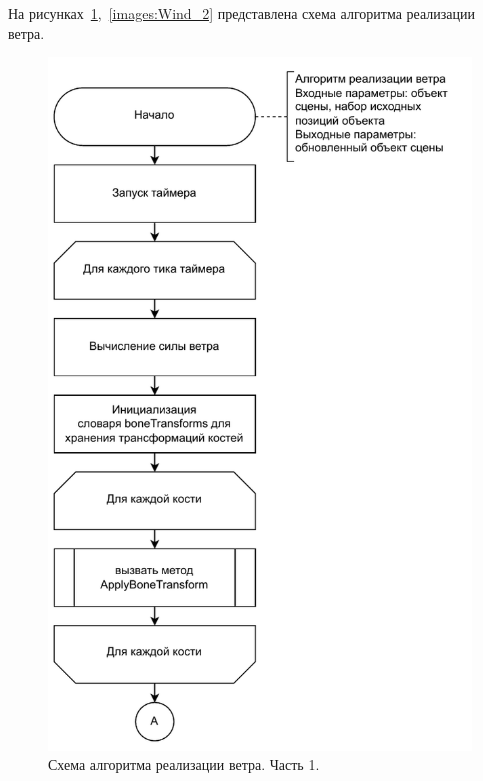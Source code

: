 \vspace{2cm}
На рисунках~\ref{images:Wind_1},~\ref{images:Wind_2} представлена схема алгоритма реализации ветра.

\begin{figure}[H]
    \centering
    \includegraphics[width=115mm]{images/Wind_1}
    \caption{Схема алгоритма реализации ветра. Часть 1.}
    \label{images:Wind_1}
\end{figure}

